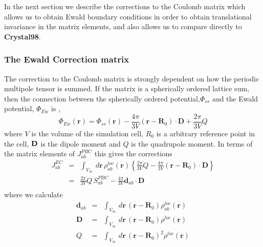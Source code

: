 \documentclass[prb,aps,nobibnotes,twocolumn,doublespace,twocolumngrid,superbib]{revtex4}
\begin{document}
In the next section we describe the corrections to the Coulomb matrix
which allows us to obtain Ewald boundary conditions in order to obtain
translational invariance in the matrix elements, and also allows us
to compare directly to \textbf{Crystal98}. 

\subsubsection{The Ewald Correction matrix}

The correction to the Coulomb matrix is strongly dependent on how
the periodic multipole tensor is summed. If the matrix is a spherically
ordered lattice sum, then the connection between the spherically ordered
potential,$\Phi _{ss}$ and the Ewald potential, $\Phi _{Ew}$ is \cite{Redlack72}, 
\begin{equation}
\Phi _{Ew}\left( \mathbf{r}\right) =\Phi _{ss}\left( \mathbf{r}\right) -\frac{4\pi }{3V}
{\left( \mathbf{r}-\mathbf{R}_{0}\right) \cdot \mathbf{D}}+\frac{2\pi }{3V}Q
\label{EW_pot}
\end{equation}
where $V$ is the volume of the simulation cell, $R_0$ is a arbitrary reference point in the cell, 
${\bf D}$ is the dipole moment and $Q$ is the quadrupole moment.
In terms of the matrix elements of \( J_{ab}^{PBC} \) this gives
the corrections
\begin{eqnarray}
J_{ab}^{EC} & = & \int _{V_{\infty }}\, d{\mathbf{r}}\, \rho ^{loc}_{ab}\left( {\mathbf{r}}
\right) \left\{ \frac{2\pi }{3V}Q-\frac{4\pi }{3V}\left( \mathbf{r}-\mathbf{R}_{0}\right) \cdot 
\mathbf{D}\right\}
\nonumber\\
 & = & \frac{2\pi }{3V}Q\, S_{ab}^{PBC}-\frac{4\pi }{3V}\mathbf{d}_{ab}\cdot \mathbf{D}
\nonumber\\
\label{Jab_ec_2} 
\end{eqnarray}
where we calculate
%
\begin{eqnarray}
{\mathbf{d}}_{ab} & = & \int _{V_{\infty }}\, d{\mathbf{r}}\, \left( \mathbf{r}-\mathbf{R}_{0}\right)
 \rho ^{loc}_{ab}\left( \mathbf{r}\right)
\label{dab} \\
{\mathbf{D}} & = & \int _{V_{\infty }}\, d{\mathbf{r}}\, \left( \mathbf{r}-\mathbf{R}_{0}\right) 
\rho ^{loc}\left( \mathbf{r}\right) 
\label{D} \\
Q & = & \int _{V_{\infty }}\, d{\mathbf{r}}\, \left( \mathbf{r}-\mathbf{R}_{0}\right) ^{2}
\rho ^{loc}\left( \mathbf{r}\right) 
\label{Q} 
\end{eqnarray}
\end{document}
